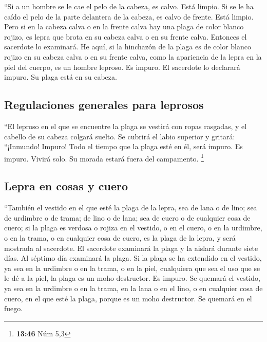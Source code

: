  ``Si a un hombre se le cae el pelo de la cabeza, es
calvo. Está limpio.  Si se le ha caído el pelo de la
parte delantera de la cabeza, es calvo de frente. Está limpio.
 Pero si en la cabeza calva o en la frente calva hay una
plaga de color blanco rojizo, es lepra que brota en su cabeza calva o en
su frente calva.  Entonces el sacerdote lo examinará. He
aquí, si la hinchazón de la plaga es de color blanco rojizo en su cabeza
calva o en su frente calva, como la apariencia de la lepra en la piel
del cuerpo,  es un hombre leproso. Es impuro. El
sacerdote lo declarará impuro. Su plaga está en su cabeza.

\hypertarget{regulaciones-generales-para-leprosos}{%
\subsection{Regulaciones generales para
leprosos}\label{regulaciones-generales-para-leprosos}}

 ``El leproso en el que se encuentre la plaga se vestirá
con ropas rasgadas, y el cabello de su cabeza colgará suelto. Se cubrirá
el labio superior y gritará: ``¡Inmundo! Impuro!  Todo el
tiempo que la plaga esté en él, será impuro. Es impuro. Vivirá solo. Su
morada estará fuera del campamento. \footnote{\textbf{13:46} Núm 5,3}

\hypertarget{lepra-en-cosas-y-cuero}{%
\subsection{Lepra en cosas y cuero}\label{lepra-en-cosas-y-cuero}}

 ``También el vestido en el que esté la plaga de la
lepra, sea de lana o de lino;  sea de urdimbre o de
trama; de lino o de lana; sea de cuero o de cualquier cosa de cuero;
 si la plaga es verdosa o rojiza en el vestido, o en el
cuero, o en la urdimbre, o en la trama, o en cualquier cosa de cuero, es
la plaga de la lepra, y será mostrada al sacerdote.  El
sacerdote examinará la plaga y la aislará durante siete días.
 Al séptimo día examinará la plaga. Si la plaga se ha
extendido en el vestido, ya sea en la urdimbre o en la trama, o en la
piel, cualquiera que sea el uso que se le dé a la piel, la plaga es un
moho destructor. Es impuro.  Se quemará el vestido, ya
sea en la urdimbre o en la trama, en la lana o en el lino, o en
cualquier cosa de cuero, en el que esté la plaga, porque es un moho
destructor. Se quemará en el fuego.

